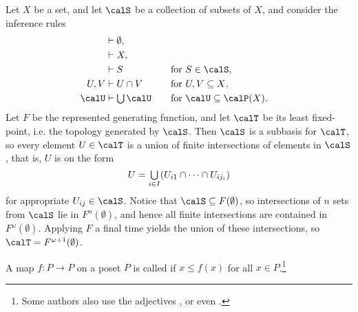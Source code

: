 \documentclass[a4paper, 11pt, article, danish, oneside]{memoir}
\DeclarePairedDelimiter{\auxdelimparen}{(}{)}
\newcommand{\powerset}[2][]{\calP\auxdelimparen[#1]{#2}}
\newcommand*\intersect\cap
\DeclareMathOperator*{\smallbigcup}{\textstyle\bigcup}
\DeclareMathOperator*{\bigunion}{\mathchoice
    {\smallbigcup}%
    {\bigcup}%
    {\bigcup}%
    {\bigcup}%
}
\begin{document}
\begin{examplebreak}[Topologies]
    Let $X$ be a set, and let $\calS$ be a collection of subsets of $X$, and consider the inference rules
    \begin{alignat*}{2}
        \myinfruleAlign{}{}{\emptyset}, \\
        \myinfruleAlign{}{}{X}, \\
        \myinfruleAlign{}{}{S} && \quad \text{for $S \in \calS$}, \\
        \myinfruleAlign{}{U,V}{U \intersect V} && \quad \text{for $U,V \subseteq X$}, \\
        \myinfruleAlign{}{\calU}{\bigunion \calU} && \quad \text{for $\calU \subseteq \powerset{X}$}.
    \end{alignat*}
    Let $F$ be the represented generating function, and let $\calT$ be its least fixed-point, i.e. the topology generated by $\calS$. Then $\calS$ is a subbasis for $\calT$, so every element $U \in \calT$ is a union of finite intersections of elements in $\calS$, that is, $U$ is on the form
    \begin{equation*}
        U
            = \bigunion_{i \in I} (U_{i1} \intersect \cdots \intersect U_{ij_i})
    \end{equation*}
    for appropriate $U_{ij} \in \calS$. Notice that $\calS \subseteq F(\emptyset)$, so intersections of $n$ sets from $\calS$ lie in $F^n(\emptyset)$, and hence all finite intersections are contained in $F^\omega(\emptyset)$. Applying $F$ a final time yields the union of these intersections, so $\calT = F^{\omega+1}(\emptyset)$.
\end{examplebreak}


A map $f \colon P \to P$ on a poset $P$ is called  if $x \leq f(x)$ for all $x \in P$.\footnote{Some authors also use the adjectives ,  or even .}
\end{document}
